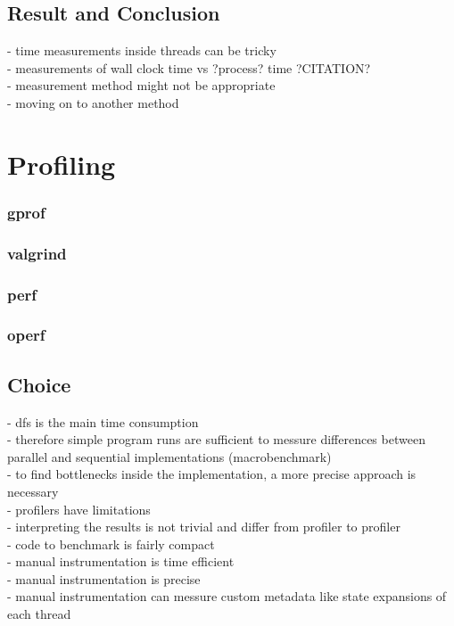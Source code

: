 \subsection{Result and Conclusion}
- time measurements inside threads can be tricky\\
- measurements of wall clock time vs ?process? time ?CITATION?\\
- measurement method might not be appropriate \\
- moving on to another method\\

\section{Profiling}
\subsubsection{gprof}
\subsubsection{valgrind}
\subsubsection{perf}
\subsubsection{operf}
\subsection{Choice}
- dfs is the main time consumption\\
- therefore simple program runs are sufficient to messure differences between parallel and sequential implementations (macrobenchmark)\\
- to find bottlenecks inside the implementation, a more precise approach is necessary\\
- profilers have limitations\\
- interpreting the results is not trivial and differ from profiler to profiler\\
- code to benchmark is fairly compact\\
- manual instrumentation is time efficient\\
- manual instrumentation is precise\\
- manual instrumentation can messure custom metadata like state expansions of each thread\\


